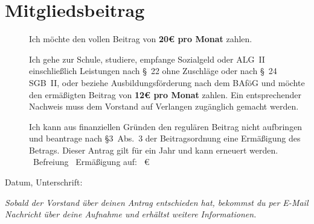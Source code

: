 \documentclass[a5paper,10pt,headings=small]{scrartcl}
\newcommand{\signskip}{\rule{0pt}{18pt}}
\newcommand{\hinweis}[1]{\emph{#1}}
\begin{document}
\section*{Mitgliedsbeitrag}
\begin{description}
  \item[\Square] Ich möchte den vollen Beitrag von \textbf{20€ pro Monat} zahlen.
  \item[\Square] Ich gehe zur Schule, studiere, empfange Sozialgeld oder ALG~II
    einschließ\-lich Leistungen nach §~22 ohne Zuschläge oder nach §~24 SGB~II,
    oder beziehe Ausbildungsförderung nach dem BAföG und möchte den ermäßigten
    Beitrag von \textbf{12€ pro Monat} zahlen. Ein entsprechender Nachweis muss
    dem Vorstand auf Verlangen zugänglich gemacht werden.
  \item[\Square] Ich kann aus finanziellen Gründen den regulären Beitrag nicht
    aufbringen und beantrage nach §3~Abs.~3 der Beitragsordnung eine Ermäßigung
    des Betrags. Dieser Antrag gilt für ein Jahr und kann erneuert werden. \\
    \Square~Befreiung \hfill
    \Square~Ermäßigung auf: \hrulefill~€\hfill\phantom{a}
\end{description}

Datum, Unterschrift: \hrulefill\signskip

\hinweis{Sobald der Vorstand über deinen Antrag entschieden hat, bekommst du per
E-Mail Nachricht über deine Aufnahme und erhältst weitere Informationen.}
\end{document}
